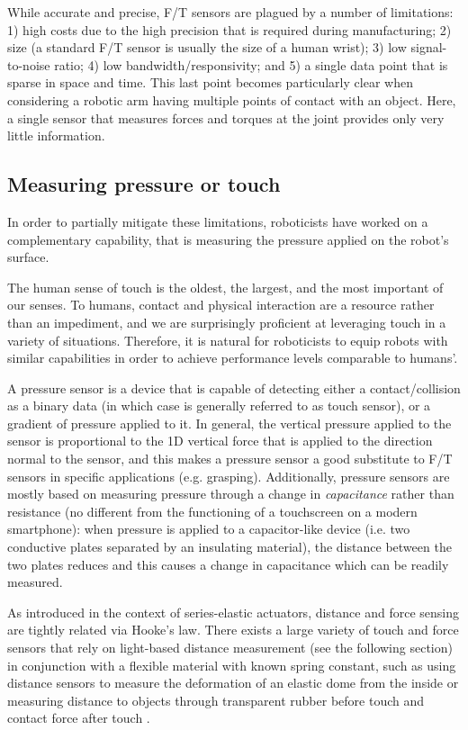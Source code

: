 While accurate and precise, F/T sensors are plagued by a number of limitations: 1) high costs due to the high precision that is required during manufacturing; 2) size (a standard F/T sensor is usually the size of a human wrist); 3) low signal-to-noise ratio; 4) low bandwidth/responsivity; and 5) a single data point that is sparse in space and time. This last point becomes particularly clear when considering a robotic arm having multiple points of contact with an object. Here, a single sensor that measures forces and torques at the joint provides only very little information. 

\subsection{Measuring pressure or touch}
In order to partially mitigate these limitations, roboticists have worked on a complementary capability, that is measuring the pressure applied on the robot's surface.

The human sense of touch is the oldest, the largest, and the most important of our senses.
To humans, contact and physical interaction are a resource rather than an impediment, and we are surprisingly proficient at leveraging touch in a variety of situations.
Therefore, it is natural for roboticists to equip robots with similar capabilities in order to achieve performance levels comparable to humans'.

A pressure sensor is a device that is capable of detecting either a contact/collision as a binary data (in which case is generally referred to as touch sensor), or a gradient of pressure applied to it.
In general, the vertical pressure applied to the sensor is proportional to the 1D vertical force that is applied to the direction normal to the sensor, and this makes a pressure sensor a good substitute to F/T sensors in specific applications (e.g. grasping).
Additionally, pressure sensors are mostly based on measuring pressure through a change in \textsl{capacitance} rather than resistance (no different from the functioning of a touchscreen on a modern smartphone): when pressure is applied to a capacitor-like device (i.e. two conductive plates separated by an insulating material), the distance between the two plates reduces and this causes a change in capacitance which can be readily measured.

As introduced in the context of series-elastic actuators, distance and force sensing are tightly related via Hooke's law. There exists a large variety of touch and force sensors that rely on light-based distance measurement (see the following section) in conjunction with a flexible material with known spring constant, such as using distance sensors to measure the deformation of an elastic dome from the inside \cite{youssefian2013contact} or measuring distance to objects through transparent rubber before touch and contact force after touch \cite{patel2018integrated}.

